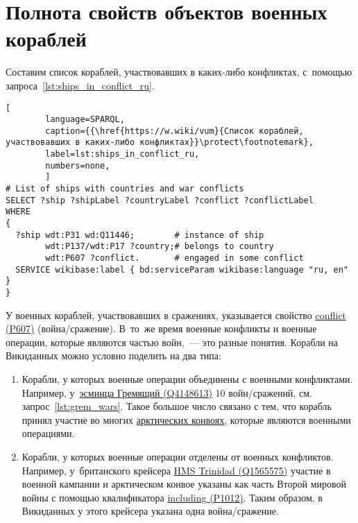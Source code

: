\section{Полнота свойств объектов военных кораблей}

Составим список кораблей, участвовавших в каких-либо конфликтах, 
с~помощью запроса~\ref{lst:ships_in_conflict_ru}.

\begin{lstlisting}[ 
        language=SPARQL, 
        caption={{\href{https://w.wiki/vum}{Список кораблей, участвовавших в каких-либо конфликтах}}\protect\footnotemark}, 
        label=lst:ships_in_conflict_ru, 
        numbers=none,
        ]
# List of ships with countries and war conflicts
SELECT ?ship ?shipLabel ?countryLabel ?conflict ?conflictLabel
WHERE
{
  ?ship wdt:P31 wd:Q11446;        # instance of ship
        wdt:P137/wdt:P17 ?country;# belongs to country
        wdt:P607 ?conflict.       # engaged in some conflict
  SERVICE wikibase:label { bd:serviceParam wikibase:language "ru, en" }
}
\end{lstlisting}



\newpage
У военных кораблей, участвовавших в сражениях, 
указывается свойство 
\href{https://www.wikidata.org/wiki/Property:P607}{conflict (P607)} (война/сражение). 
В~то~же время военные конфликты и военные операции, 
которые являются частью войн,~--- это разные понятия. 
Корабли на Викиданных можно условно поделить на два типа:

\begin{enumerate}
  \item Корабли, у которых военные операции объединены с военными конфликтами. 
      Например, у~\href{https://www.wikidata.org/wiki/Q4148613}{эсминца Гремящий (Q4148613)} 10 войн/сражений, 
        см. запрос~\ref{lst:grem_wars}. 
        Такое большое число связано с тем, 
        что корабль принял участие во многих 
        \href{https://ru.wikipedia.org/wiki/Арктические_конвои}{арктических конвоях}, 
        которые являются военными операциями.
  \item Корабли, у которых военные операции отделены от военных конфликтов. 
      Например, у~британского крейсера 
        \href{https://www.wikidata.org/wiki/Q1565575}{HMS Trinidad (Q1565575)} 
        участие в военной кампании и арктическом конвое указаны как часть Второй мировой войны 
        с помощью квалификатора 
        \href{https://www.wikidata.org/wiki/Property:P1012}{including (P1012)}. 
        Таким образом, в Викиданных у этого крейсера указана одна война/сра\-жение.
\end{enumerate}


